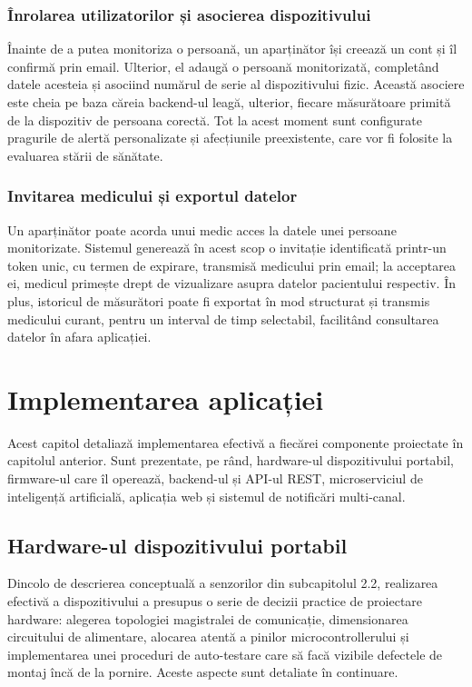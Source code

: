 \documentclass[12pt,a4paper]{article}
\begin{document}
\subsubsection{Înrolarea utilizatorilor și asocierea dispozitivului}

Înainte de a putea monitoriza o persoană, un aparținător își creează un cont și îl confirmă prin email. Ulterior, el adaugă o persoană monitorizată, completând datele acesteia și asociind numărul de serie al dispozitivului fizic. Această asociere este cheia pe baza căreia backend-ul leagă, ulterior, fiecare măsurătoare primită de la dispozitiv de persoana corectă. Tot la acest moment sunt configurate pragurile de alertă personalizate și afecțiunile preexistente, care vor fi folosite la evaluarea stării de sănătate.

\subsubsection{Invitarea medicului și exportul datelor}

Un aparținător poate acorda unui medic acces la datele unei persoane monitorizate. Sistemul generează în acest scop o invitație identificată printr-un token unic, cu termen de expirare, transmisă medicului prin email; la acceptarea ei, medicul primește drept de vizualizare asupra datelor pacientului respectiv. În plus, istoricul de măsurători poate fi exportat în mod structurat și transmis medicului curant, pentru un interval de timp selectabil, facilitând consultarea datelor în afara aplicației.

\newpage
\section{Implementarea aplicației}

Acest capitol detaliază implementarea efectivă a fiecărei componente proiectate în capitolul anterior. Sunt prezentate, pe rând, hardware-ul dispozitivului portabil, firmware-ul care îl operează, backend-ul și API-ul REST, microserviciul de inteligență artificială, aplicația web și sistemul de notificări multi-canal.

\subsection{Hardware-ul dispozitivului portabil}

Dincolo de descrierea conceptuală a senzorilor din subcapitolul 2.2, realizarea efectivă a dispozitivului a presupus o serie de decizii practice de proiectare hardware: alegerea topologiei magistralei de comunicație, dimensionarea circuitului de alimentare, alocarea atentă a pinilor microcontrollerului și implementarea unei proceduri de auto-testare care să facă vizibile defectele de montaj încă de la pornire. Aceste aspecte sunt detaliate în continuare.
\end{document}
